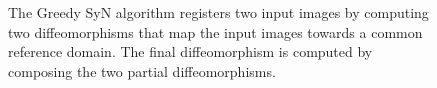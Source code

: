 \begin{figure}[t]
\centering
{}
\caption{The Greedy SyN algorithm registers two input images by computing two diffeomorphisms that map the input images towards a common reference domain. The final
diffeomorphism is computed by composing the two partial diffeomorphisms.}
\label{fig:syn_overview}
\end{figure}

